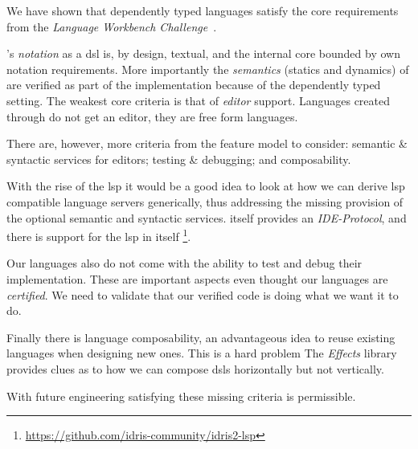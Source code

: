 
We have shown that dependently typed languages satisfy the core requirements from the \emph{Language Workbench Challenge}~\cite{DBLP:conf/sle/ErdwegSVBBCGHKLKMPPSSSVVVWW13}.

\Velo{}'s \emph{notation} as a \ac{dsl} is, by design, textual, and the internal core bounded by \Idris{} own notation requirements.
%
More importantly the \emph{semantics} (statics and dynamics) of \Velo{} are verified as part of the implementation because of the dependently typed setting.
%
The weakest core criteria is that of \emph{editor} support.
%
Languages created through \Idris{} do not get an editor, they are free form languages.

%
There are, however, more criteria from the feature model to consider:
%
semantic \& syntactic services for editors;
%
testing \& debugging;
%
and
%
composability.
%

With the rise of the \ac{lsp} it would be a good idea to look at how we can derive \ac{lsp} compatible language servers generically, thus addressing the missing provision of the optional semantic and syntactic services.
\Idris{} itself provides an \emph{IDE-Protocol}, and there is support for the \ac{lsp} in \Idris{} itself
\footnote{\url{https://github.com/idris-community/idris2-lsp}}.


Our languages also do not come with the ability to test and debug their implementation.
These are important aspects even thought our languages are \emph{certified}.
%
We need to validate that our verified code is doing what we want it to do.


Finally there is language composability, an advantageous idea to reuse existing languages when designing new ones.
This is a hard problem
The \emph{Effects} library~\cite{DBLP:conf/icfp/Brady13} provides clues as to how we can compose \acp{dsl} horizontally but not vertically.

With future engineering satisfying these missing criteria is permissible.


